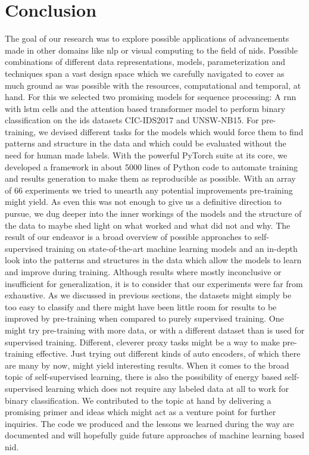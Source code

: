 \chapter{Conclusion} \label{sec:conclusion}

The goal of our research was to explore possible applications of advancements made in other domains like \gls{nlp} or visual computing to the field of \gls{nids}. Possible combinations of different data representations, models, parameterization and techniques span a vast design space which we carefully navigated to cover as much ground as was possible with the resources, computational and temporal, at hand. For this we selected two promising models for sequence processing: A \gls{rnn} with \gls{lstm} cells and the attention based transformer model to perform binary classification on the \gls{ids} datasets CIC-IDS2017 and UNSW-NB15. For pre-training, we devised different tasks for the models which would force them to find patterns and structure in the data and which could be evaluated without the need for human made labels. With the powerful PyTorch suite at its core, we developed a framework in about 5000 lines of Python code to automate training and results generation to make them as reproducible as possible. With an array of 66 experiments we tried to unearth any potential improvements pre-training might yield. As even this was not enough to give us a definitive direction to pursue, we dug deeper into the inner workings of the models and the structure of the data to maybe shed light on what worked and what did not and why. The result of our endeavor is a broad overview of possible approaches to self-supervised training on state-of-the-art machine learning models and an in-depth look into the patterns and structures in the data which allow the models to learn and improve during training. Although results where mostly inconclusive or insufficient for generalization, it is to consider that our experiments were far from exhaustive. As we discussed in previous sections, the datasets might simply be too easy to classify and there might have been little room for results to be improved by pre-training when compared to purely supervised training. One might try pre-training with more data, or with a different dataset than is used for supervised training. Different, cleverer proxy tasks might be a way to make pre-training effective. Just trying out different kinds of auto encoders, of which there are many by now, might yield interesting results. When it comes to the broad topic of self-supervised learning, there is also the possibility of energy based self-supervised learning which does not require any labeled data at all to work for binary classification. We contributed to the topic at hand by delivering a promising primer and ideas which might act as a venture point for further inquiries. The code we produced and the lessons we learned during the way are documented and will hopefully guide future approaches of machine learning based \gls{nid}. 

\newpage